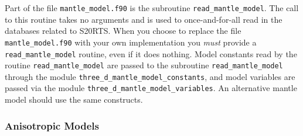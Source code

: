\documentclass[onecolumn]{article}
\begin{document}
Part of the file \texttt{mantle\_model.f90} is the
subroutine \texttt{read\_mantle\_model}.
The call to this routine takes no arguments and is used to once-and-for-all
read in the databases related to S20RTS. When you choose to replace
the file \texttt{mantle\_model.f90} with your own implementation you
\textit{must} provide a \texttt{read\_mantle\_model} routine,
even if it does nothing.
Model constants read by the routine \texttt{read\_mantle\_model}
are passed to the subroutine \texttt{read\_mantle\_model} through
the module \texttt{three\_d\_mantle\_model\_constants},
and model variables are passed via the module
\texttt{three\_d\_mantle\_model\_variables}.
An alternative mantle model should use the same constructs.

\subsubsection{Anisotropic Models}
\end{document}

